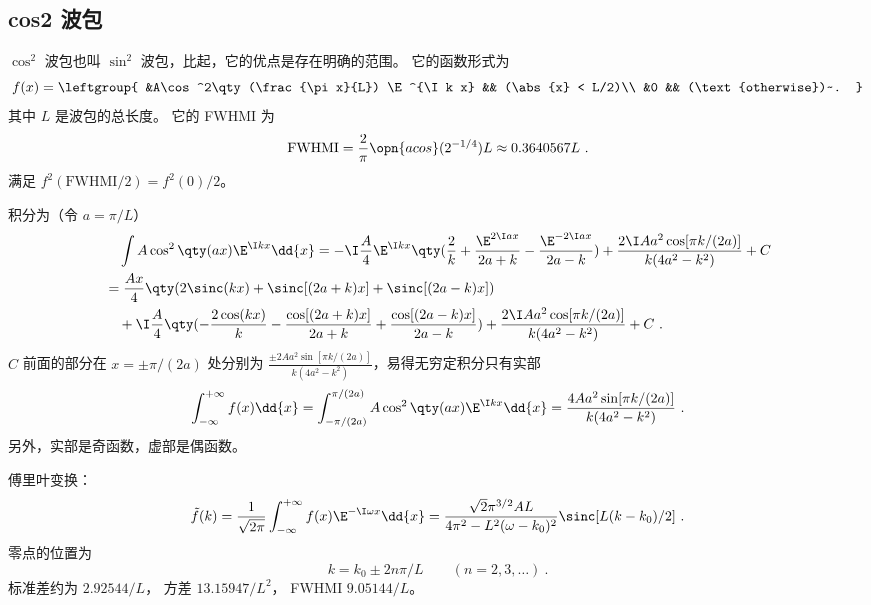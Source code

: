 
\subsection{cos2 波包}
$\cos^2$ 波包也叫 $\sin^2$ 波包，比起，它的优点是存在明确的范围。 它的函数形式为
\begin{equation}\label{eq_cos2wp_5}
f(x) = \leftgroup{
&A\cos^2\qty(\frac{\pi x}{L}) \E^{\I k x} && (\abs{x} < L/2)\\
&0 && (\text{otherwise})~.
}\end{equation}
其中 $L$ 是波包的总长度。 它的 FWHMI 为
\begin{equation}\label{eq_cos2wp_4} %
\text{FWHMI} = \frac{2}{\pi}\opn{acos}(2^{-1/4}) L \approx 0.3640567 L~.
\end{equation}
满足 $f^2(\text{FWHMI/2}) = f^2(0)/2$。

积分为（令 $a = \pi/L$）
\begin{equation}\label{eq_cos2wp_2} %
\begin{aligned}
&\quad \int A\cos^2\qty(a x) \E^{\I kx} \dd{x} = -\I\frac{A}{4}\E^{\I kx}\qty(\frac{2}{k} +\frac{\E^{2\I ax}}{2a+k} -\frac{\E^{-2\I ax}}{2a-k}) + \frac{2\I Aa^2\cos[{\pi k}/{(2a)}]}{k(4 a^2 -k^2)} + C\\
&= \frac{Ax}{4} \qty(2\sinc(k x) + \sinc[(2 a+k)x] + \sinc[(2 a-k)x])\\
&\quad + \I\frac{A}{4} \qty(-\frac{2\cos(k x)}{k} -\frac{\cos[(2 a+k)x]}{2 a+k} +\frac{\cos[(2 a-k)x]}{2 a-k}) + \frac{2\I Aa^2\cos[{\pi k}/{(2a)}]}{k(4 a^2 -k^2)} + C~.
\end{aligned}
\end{equation}
$C$ 前面的部分在 $x = \pm\pi/(2a)$ 处分别为 $\frac{\pm 2 Aa^2\sin[{\pi k}/{(2a)}]}{k(4 a^2 -k^2)}$，易得无穷定积分只有实部
\begin{equation}%
\int_{-\infty}^{+\infty} f(x) \dd{x} = \int_{-\pi/(2a)}^{\pi/(2a)} A\cos^2\qty(a x)\E^{\I k x} \dd{x} = \frac{4 Aa^2\sin[{\pi k}/{(2a)}]}{k(4 a^2 -k^2)}~.
\end{equation}
另外，实部是奇函数，虚部是偶函数。

傅里叶变换：
\begin{equation} %
\tilde f(k) = \frac{1}{\sqrt{2\pi}} \int_{-\infty}^{+\infty} f(x) \E^{-\I \omega x} \dd{x}
= \frac{\sqrt{2} \pi ^{3/2} A L}{4 \pi ^2-L^2 (\omega-k_0)^2} \sinc[L(k-k_0)/2]~.
\end{equation}
零点的位置为
\begin{equation} %
k = k_0 \pm 2n\pi/L \qquad (n=2,3,\dots)~.
\end{equation}
标准差约为 $2.92544/L$， 方差 $13.15947/L^2$， FWHMI $9.05144/L$。


